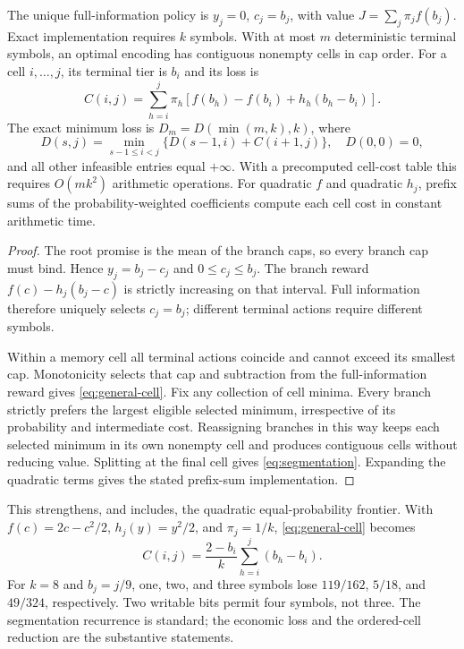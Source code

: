 \begin{theorem}\label{thm:frontier}
The unique full-information policy is $y_j=0$, $c_j=b_j$, with value $J=\sum_j\pi_j f(b_j)$. Exact implementation requires $k$ symbols. With at most $m$ deterministic terminal symbols, an optimal encoding has contiguous nonempty cells in cap order. For a cell $i,\ldots,j$, its terminal tier is $b_i$ and its loss is
\begin{equation}\label{eq:general-cell}
 C(i,j)=\sum_{h=i}^j\pi_h\left[f(b_h)-f(b_i)+h_h(b_h-b_i)\right].
\end{equation}
The exact minimum loss is $D_m=D(\min(m,k),k)$, where
\begin{equation}\label{eq:segmentation}
 D(s,j)=\min_{s-1\leq i<j}\{D(s-1,i)+C(i+1,j)\},\quad D(0,0)=0,
\end{equation}
and all other infeasible entries equal $+\infty$. With a precomputed cell-cost table this requires $O(mk^2)$ arithmetic operations. For quadratic $f$ and quadratic $h_j$, prefix sums of the probability-weighted coefficients compute each cell cost in constant arithmetic time.
\end{theorem}
\begin{proof}
The root promise is the mean of the branch caps, so every branch cap must bind. Hence $y_j=b_j-c_j$ and $0\leq c_j\leq b_j$. The branch reward $f(c)-h_j(b_j-c)$ is strictly increasing on that interval. Full information therefore uniquely selects $c_j=b_j$; different terminal actions require different symbols.

Within a memory cell all terminal actions coincide and cannot exceed its smallest cap. Monotonicity selects that cap and subtraction from the full-information reward gives \eqref{eq:general-cell}. Fix any collection of cell minima. Every branch strictly prefers the largest eligible selected minimum, irrespective of its probability and intermediate cost. Reassigning branches in this way keeps each selected minimum in its own nonempty cell and produces contiguous cells without reducing value. Splitting at the final cell gives \eqref{eq:segmentation}. Expanding the quadratic terms gives the stated prefix-sum implementation.\end{proof}

This strengthens, and includes, the quadratic equal-probability frontier. With $f(c)=2c-c^2/2$, $h_j(y)=y^2/2$, and $\pi_j=1/k$, \eqref{eq:general-cell} becomes
\begin{equation}\label{eq:old-cell}
 C(i,j)=\frac{2-b_i}{k}\sum_{h=i}^j(b_h-b_i).
\end{equation}
For $k=8$ and $b_j=j/9$, one, two, and three symbols lose $119/162$, $5/18$, and $49/324$, respectively. Two writable bits permit four symbols, not three. The segmentation recurrence is standard; the economic loss and the ordered-cell reduction are the substantive statements.


